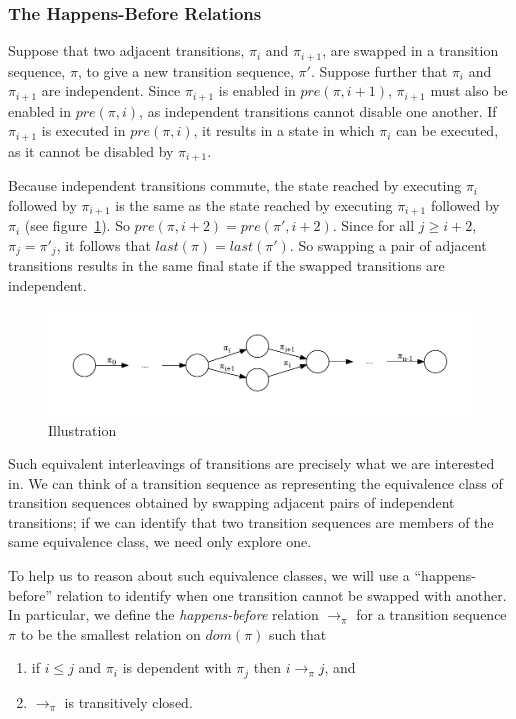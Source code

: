 \documentclass[12pt,a4paper,twoside,openright]{report}
\begin{document}
\subsubsection{The Happens-Before Relations}\label{sec:happens-before}

Suppose that two adjacent transitions, $\pi_i$ and $\pi_{i+1}$,
are swapped in a
transition sequence, $\pi$, to give a new
transition sequence, $\pi'$. Suppose further
that $\pi_i$ and $\pi_{i+1}$ are independent.
Since $\pi_{i+1}$ is enabled in $\textit{pre}(\pi, i+1)$,
$\pi_{i+1}$ must also be enabled in $\textit{pre}(\pi, i)$,
as independent transitions cannot disable one another.
If $\pi_{i+1}$
is executed in $\textit{pre}(\pi, i)$,
it results in a state in which $\pi_i$
can be executed, as it cannot be disabled by $\pi_{i+1}$.

Because independent transitions commute, the state reached by
executing $\pi_i$ followed by $\pi_{i+1}$ is the same
as the state reached by executing $\pi_{i+1}$ followed
by $\pi_i$ (see figure~\ref{fig:sequence-equivalence}).
So $\textit{pre}(\pi, i+2) = \textit{pre}(\pi', i+2)$. Since
for all $j \geq i + 2$, $\pi_j = \pi'_j$, it follows that
$\textit{last}(\pi) = \textit{last}(\pi')$. So swapping
a pair of adjacent transitions results in the same
final state if the swapped transitions are independent.

\begin{figure}
	\centering
	\includegraphics[width=\textwidth]{seqequiv}
	\caption{Illustration}
	\label{fig:sequence-equivalence}
\end{figure}

Such equivalent interleavings
of transitions are precisely what we are interested in.
We can think of a transition sequence as representing
the equivalence class of transition sequences obtained
by swapping adjacent pairs of independent transitions;
if we can identify that two transition sequences are
members of the same equivalence class, we need only
explore one.

To help us to reason about such equivalence classes,
we will use a ``happens-before'' relation to identify
when one transition cannot be swapped with another.
In particular, we define the \emph{happens-before}
relation $\longrightarrow_\pi$ for a transition
sequence $\pi$ to be the smallest relation on
$\textit{dom}(\pi)$ such that
\begin{enumerate}
	\item if $i \leq j$ and $\pi_i$ is dependent with
		$\pi_j$ then $i \longrightarrow_\pi j$, and
	\item $\longrightarrow_\pi$ is transitively closed.
\end{enumerate}
\end{document}
